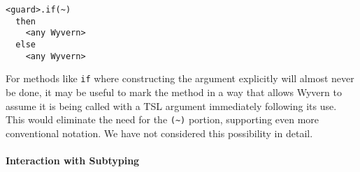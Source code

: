 \begin{lstlisting}
<guard>.if(~)
  then
    <any Wyvern>
  else
    <any Wyvern>
\end{lstlisting}

For methods like \verb|if| where constructing the argument explicitly will almost never be done, it may be useful to mark the method in a way that allows Wyvern to assume it is being called with a TSL argument immediately following its use. This would eliminate the need for the \verb|(~)| portion, supporting even more conventional notation. We have not considered this possibility in detail.

%
%

\paragraph{Interaction with Subtyping}

